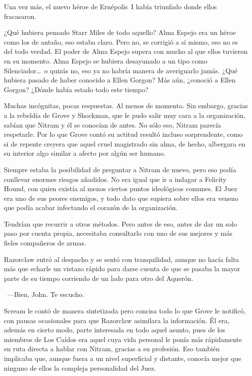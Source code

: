 Una vez más, el nuevo héroe de Ernépolis~I había triunfado donde ellos fracasaron.

¿Qué hubiera pensado Starr Miles de todo aquello? Alma Espejo era un héroe como los de antaño, eso estaba claro. Pero no, se corrigió a sí mismo, eso no es del todo verdad. El poder de Alma Espejo supera con mucho al que ellos tuvieron en su momento. Alma Espejo se hubiera desayunado a un tipo como Silenciador\dots\ o quizás no, eso ya no habría manera de averiguarlo jamás. ¿Qué hubiera pasado de haber conocido a Ellen Gorgon? Más aún, ¿conoció a Ellen Gorgon? ¿Dónde había estado todo este tiempo?

Muchas incógnitas, pocas respuestas. Al menos de momento. Sin embargo, gracias a la rebeldía de Grove y Shockman, que le pudo salir muy cara a la organización, sabían que Nitram y él se conocían de antes. No sólo eso, Nitram parecía respetarle. Por lo que Grove contó su actitud resultó incluso sorprendente, como si de repente creyera que aquel cruel magistrado sin alma, de hecho, albergara en su interior algo similar a afecto por algún ser humano.

Siempre estaba la posibilidad de preguntar a Nitram de nuevo, pero eso podía conllevar enormes riesgos añadidos. No era igual que ir a indagar a Felicity Hound, con quien existía al menos ciertos puntos ideológicos comunes. El Juez era uno de sus peores enemigos, y todo dato que supiera sobre ellos era veneno que podía acabar infectando el corazón de la organización.

Tendrían que recurrir a otros métodos. Pero antes de eso, antes de dar un solo paso por cuenta propia, necesitaba consultarlo con uno de sus mejores y más fieles compañeros de armas.

Razorclaw entró al despacho y se sentó con tranquilidad, aunque no hacía falta más que echarle un vistazo rápido para darse cuenta de que se pasaba la mayor parte de su tiempo corriendo de un lado para otro del Aquerón.

~---Bien, John. Te escucho.

Scream le contó de manera sintetizada pero concisa todo lo que Grove le notificó, con pausas ocasionales para que Razorclaw asimilara la información. Él era, además en cierto modo, parte interesada en todo aquel asunto, pues de los miembros de Los Caídos era aquel cuya vida personal le ponía más rápidamente en ruta directa a hablar con Nitram, gracias a su profesión. Eso también implicaba que, aunque fuera a un nivel superficial y distante, conocía mejor que ninguno de ellos la compleja personalidad del Juez.


